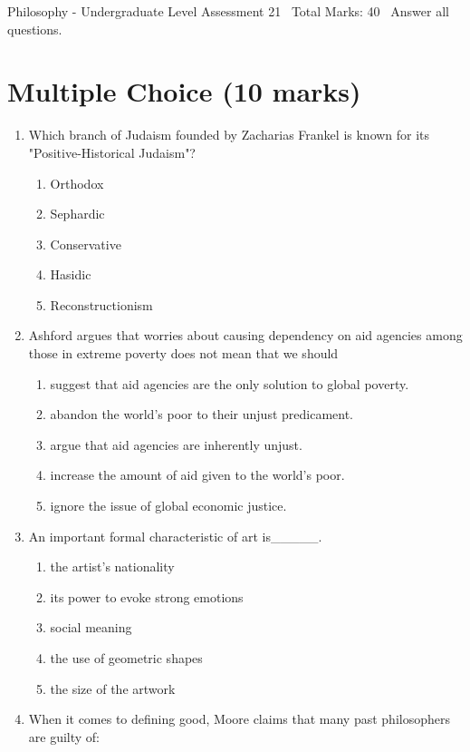 \documentclass[12pt]{article}
\begin{document}
\begin{center}
Philosophy - Undergraduate Level Assessment 21 \
Total Marks: 40 \
Answer all questions.
\end{center}

\section*{Multiple Choice (10 marks)}
\begin{enumerate}[label=\arabic*.]
\item Which branch of Judaism founded by Zacharias Frankel is known for its "Positive-Historical Judaism"?
\begin{enumerate}[label=(\alph*)]
    \item Orthodox
    \item Sephardic
    \item Conservative
    \item Hasidic
    \item Reconstructionism
\end{enumerate}
\item Ashford argues that worries about causing dependency on aid agencies among those in extreme poverty does not mean that we should
\begin{enumerate}[label=(\alph*)]
    \item suggest that aid agencies are the only solution to global poverty.
    \item abandon the world's poor to their unjust predicament.
    \item argue that aid agencies are inherently unjust.
    \item increase the amount of aid given to the world's poor.
    \item ignore the issue of global economic justice.
\end{enumerate}
\item An important formal characteristic of art is\_\_\_\_\_.
\begin{enumerate}[label=(\alph*)]
    \item the artist's nationality
    \item its power to evoke strong emotions
    \item social meaning
    \item the use of geometric shapes
    \item the size of the artwork
\end{enumerate}
\item When it comes to defining good, Moore claims that many past philosophers are guilty of:

\end{enumerate}
\end{document}
